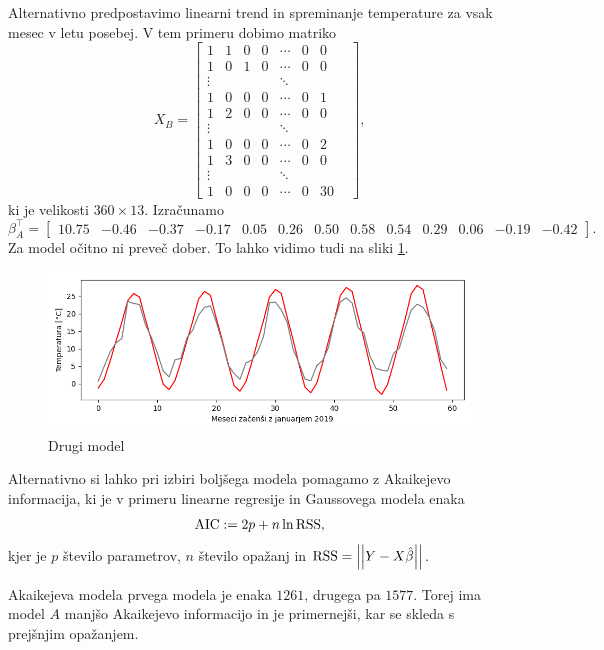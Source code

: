 \documentclass[12pt, a4paper]{article}
\begin{document}
Alternativno predpostavimo linearni trend in spreminanje temperature za 
vsak mesec v letu posebej. V tem primeru dobimo matriko
\[
    X_B = \begin{bmatrix}
        1 & 1 & 0 & 0 & \cdots & 0 & 0 \\
        1 & 0 & 1 & 0 & \cdots & 0 & 0 \\
        \vdots & & & & \ddots & & & \\
        1 & 0 & 0 & 0 & \cdots & 0 & 1 \\
        1 & 2 & 0 & 0 & \cdots & 0 & 0 \\
        \vdots & & & & \ddots & & & \\
        1 & 0 & 0 & 0 & \cdots & 0 & 2 \\
        1 & 3 & 0 & 0 & \cdots & 0 & 0 \\
        \vdots & & & & \ddots & & & \\
        1 & 0 & 0 & 0 & \cdots & 0 & 30 
    \end{bmatrix},
\]
ki je velikosti $360 \times 13$. Izračunamo
\setcounter{MaxMatrixCols}{20}
\footnotesize
\[
    \beta_A^\top = \begin{bmatrix}
        10.75 & -0.46 & -0.37 & -0.17 & 0.05 & 0.26 & 
        0.50 & 0.58 & 0.54 & 0.29 & 0.06 & -0.19 & -0.42
    \end{bmatrix}.
\]
\normalsize
Za model očitno ni preveč dober. To lahko vidimo tudi na sliki 
\ref{png:drugi}.

\begin{figure}[H]
    \centering
    \includegraphics[width=14cm]{Slike/drugi_model.png}
    \caption{Drugi model}
    \label{png:drugi}
\end{figure}

Alternativno si lahko pri izbiri boljšega modela pomagamo z Akaikejevo informacija, 
ki je v primeru linearne regresije in Gaussovega modela enaka
\[
    \operatorname{AIC} := 2p + n \ln \operatorname{RSS},
\]
kjer je $p$ število parametrov, $n$ število opažanj in $\operatorname{RSS} = \left\lvert\left\lvert Y - X\hat \beta\right\rvert\right\rvert$.

Akaikejeva modela prvega modela je enaka $1261$,
drugega pa $1577$. Torej ima model $A$
manjšo Akaikejevo informacijo in je primernejši, kar se skleda s 
prejšnjim opažanjem.
\end{document}
